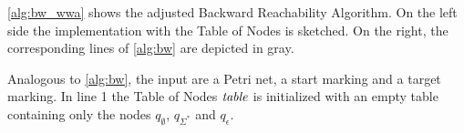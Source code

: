 \par

\autoref{alg:bw_wwa} shows the adjusted Backward Reachability Algorithm. On the left side the implementation with the Table of Nodes is sketched. On the right, the corresponding lines of \autoref{alg:bw} are depicted in gray.

\par 

Analogous to \autoref{alg:bw}, the input are a Petri net, a start marking and a target marking. In line 1 the Table of Nodes $\mathit{table}$ is initialized with an empty table containing only the nodes $q_{\emptyset}$, $q_{\Sigma^{*}}$ and $q_{\epsilon}$. 


\newenvironment{algocolor}{%
   \color{gray}
}{}

